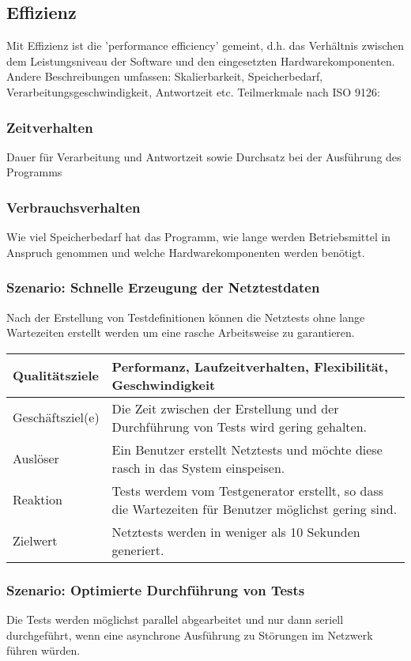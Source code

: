 \documentclass[
	ngerman,
	toc=listof, %
	toc=bibliography, %
	footnotes=multiple, %
	parskip=half, %
	numbers=noendperiod %
]{scrartcl}
\begin{document}
	\subsection{Effizienz}
	Mit Effizienz ist die 'performance efficiency' gemeint, d.h. das Verhältnis zwischen dem Leistungsniveau der Software und den eingesetzten Hardwarekomponenten. 
	Andere Beschreibungen umfassen: Skalierbarkeit, Speicherbedarf, Verarbeitungsgeschwindigkeit, Antwortzeit etc.
	Teilmerkmale nach ISO 9126:

		\subsubsection{Zeitverhalten}
		Dauer für Verarbeitung und Antwortzeit sowie Durchsatz bei der Ausführung des Programms

		\subsubsection{Verbrauchsverhalten}
		Wie viel Speicherbedarf hat das Programm, wie lange werden Betriebsmittel in Anspruch genommen und welche Hardwarekomponenten werden benötigt.

		\subsubsection{Szenario: Schnelle Erzeugung der Netztestdaten}
		Nach der Erstellung von Testdefinitionen können die Netztests ohne lange Wartezeiten erstellt werden um eine rasche Arbeitsweise zu garantieren.
			
		\begin{tabularx}{\textwidth}{lX}
				\toprule
				Qualitätsziele & Performanz, Laufzeitverhalten, Flexibilität, Geschwindigkeit  \\
				\midrule
				Geschäftsziel(e) & Die Zeit zwischen der Erstellung und der Durchführung von Tests wird gering gehalten.  \\
				\midrule
				Auslöser & Ein Benutzer erstellt Netztests und möchte diese rasch in das System einspeisen.  \\
				\midrule
				Reaktion & Tests werdem vom Testgenerator erstellt, so dass die Wartezeiten für Benutzer möglichst gering sind.  \\
				\midrule
				Zielwert & Netztests werden in weniger als 10 Sekunden generiert.  \\
				\bottomrule
			\end{tabularx}

		\subsubsection{Szenario: Optimierte Durchführung von Tests}
		Die Tests werden möglichst parallel abgearbeitet und nur dann seriell durchgeführt, wenn eine asynchrone Ausführung zu Störungen im Netzwerk führen würden. 
		
\end{document}
